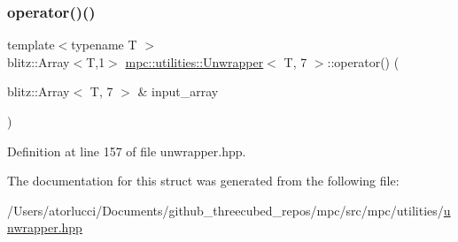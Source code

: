 \subsubsection{\texorpdfstring{operator()()}{operator()()}}
{\footnotesize\ttfamily template$<$typename T $>$ \\
blitz\+::\+Array$<$T,1$>$ \mbox{\hyperlink{structmpc_1_1utilities_1_1_unwrapper}{mpc\+::utilities\+::\+Unwrapper}}$<$ T, 7 $>$\+::operator() (\begin{DoxyParamCaption}\item[{blitz\+::\+Array$<$ T, 7 $>$ \&}]{input\+\_\+array }\end{DoxyParamCaption})\hspace{0.3cm}{\ttfamily [inline]}}



Definition at line 157 of file unwrapper.\+hpp.



The documentation for this struct was generated from the following file\+:\begin{DoxyCompactItemize}
\item 
/\+Users/atorlucci/\+Documents/github\+\_\+threecubed\+\_\+repos/mpc/src/mpc/utilities/\mbox{\hyperlink{unwrapper_8hpp}{unwrapper.\+hpp}}\end{DoxyCompactItemize}
